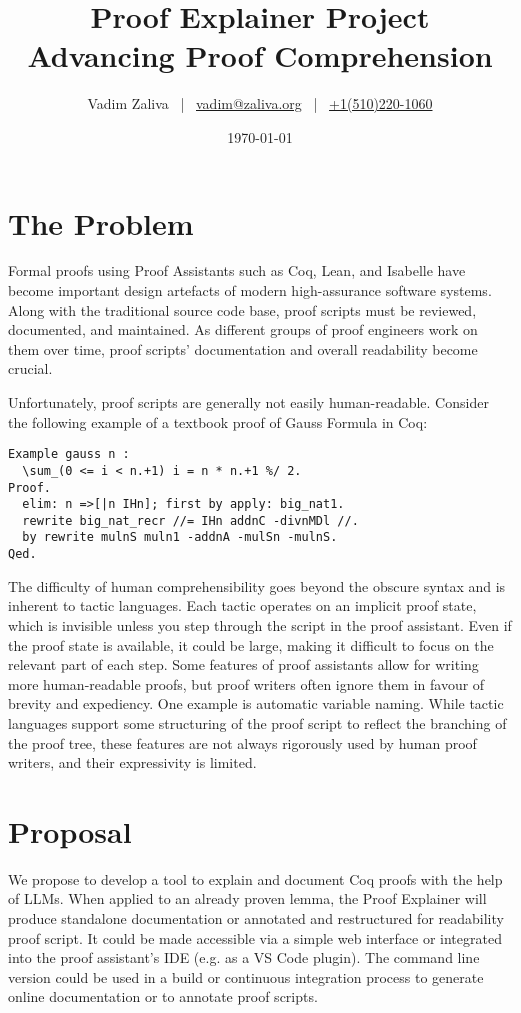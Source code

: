 \documentclass[letterpaper]{article}
\title{Proof Explainer Project \\ Advancing Proof Comprehension}
\author{Vadim Zaliva ~|~ \href{mailto:vadim@zaliva.org}{vadim@zaliva.org} ~|~ \href{tel:+15102201060}{+1(510)220-1060}}
\date{\today}
\begin{document}
\maketitle

\section*{The Problem}

Formal proofs using Proof Assistants such as Coq, Lean, and Isabelle
have become important design artefacts of modern high-assurance
software systems. Along with the traditional source code base, proof
scripts must be reviewed, documented, and maintained. As different
groups of proof engineers work on them over time, proof scripts'
documentation and overall readability become crucial.

Unfortunately, proof scripts are generally not easily
human-readable. Consider the following example of a textbook
\cite{mahboubi2021mathematical} proof of Gauss Formula in Coq:

\begin{lstlisting}[basicstyle=\ttfamily\footnotesize]
Example gauss n :
  \sum_(0 <= i < n.+1) i = n * n.+1 %/ 2.
Proof.
  elim: n =>[|n IHn]; first by apply: big_nat1.
  rewrite big_nat_recr //= IHn addnC -divnMDl //.
  by rewrite mulnS muln1 -addnA -mulSn -mulnS.
Qed.
\end{lstlisting}

The difficulty of human comprehensibility goes beyond the obscure
syntax and is inherent to tactic languages. Each tactic operates on an
implicit proof state, which is invisible unless you step through the
script in the proof assistant. Even if the proof state is available,
it could be large, making it difficult to focus on the relevant part
of each step. Some features of proof assistants allow for writing more
human-readable proofs, but proof writers often ignore them in favour
of brevity and expediency. One example is automatic variable
naming. While tactic languages support some structuring of the proof
script to reflect the branching of the proof tree, these features are
not always rigorously used by human proof writers, and their
expressivity is limited.

\section*{Proposal}

We propose to develop a tool to explain and document Coq proofs with
the help of LLMs. When applied to an already proven lemma, the Proof
Explainer will produce standalone documentation or annotated and
restructured for readability proof script. It could be made accessible
via a simple web interface or integrated into the proof assistant’s
IDE (e.g. as a VS Code plugin). The command line version could be used
in a build or continuous integration process to generate online
documentation or to annotate proof scripts.
\end{document}
